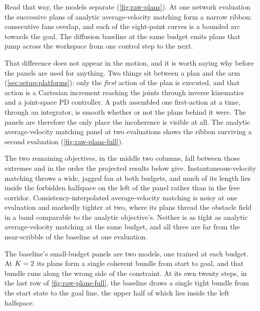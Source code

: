 
Read that way, the models separate (\autoref{fig:raw-plans}). At one network evaluation the successive
plans of analytic average-velocity matching form a narrow ribbon: consecutive fans overlap, and each of
the eight-point curves is a bounded arc towards the goal. The diffusion baseline at the same budget emits
plans that jump across the workspace from one control step to the next.

That difference does not appear in the motion, and it is worth saying why before the panels are used for
anything. Two things sit between a plan and the arm (\autoref{sec:setup:platforms}): only the
\emph{first} action of the plan is executed, and that action is a Cartesian increment reaching the joints
through inverse kinematics and a joint-space PD controller. A path assembled one first-action at a time,
through an integrator, is smooth whether or not the plans behind it were. The panels are therefore the
only place the incoherence is visible at all. The analytic average-velocity matching panel at two
evaluations shows the ribbon surviving a second evaluation (\autoref{fig:raw-plans-full}).

The two remaining objectives, in the middle two columns, fall between those extremes and in the order
the projected results below give. Instantaneous-velocity matching throws a wide, jagged fan at both budgets, and much of its length
lies inside the forbidden halfspace on the left of the panel rather than in the free corridor.
Consistency-interpolated average-velocity matching is noisy at one evaluation and markedly tighter at two,
where its plans thread the obstacle field in a band comparable to the analytic objective's. Neither is as
tight as analytic average-velocity matching at the same budget, and all three are far from the near-scribble
of the baseline at one evaluation.

The baseline's small-budget panels are two models, one trained at each budget. At $K=2$ its plans
form a single coherent bundle from start to goal, and that bundle runs along the wrong side of the
constraint. At its own twenty steps, in the last row of \autoref{fig:raw-plans-full}, the baseline draws a single tight bundle from the
start state to the goal line, the upper half of which lies inside the left halfspace.

